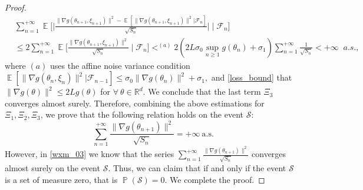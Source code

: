 \documentclass[standalone]{article}
\DeclareMathOperator{\Expect}{\mathbb{E}}
\DeclareMathOperator{\Pro}{\mathbb{P}}
\begin{document}
\begin{proof}
\begin{align*}
&\sum_{n=1}^{+\infty}\Expect\Bigg[\bigg|\frac{\|\nabla g(\theta_{n+1},\xi_{n+1})\|^{2}-\Expect[\|\nabla g(\theta_{n+1},\xi_{n+1})\|^{2}|\mathscr{F}_{n}]}{\sqrt{S_{n}}}\bigg| \mid \mathscr{F}_{n}\Bigg]\\ 
& \leq 2\sum_{n=1}^{+\infty}\Expect\Bigg[\frac{\|\nabla g(\theta_{n+1},\xi_{n+1})\|^{2}}{\sqrt{S_{n}}} \mid \mathscr{F}_{n}\Bigg]  \mathop{<}^{(a)}2(2 L\sigma_{0}\sup_{n\ge 1}g(\theta_{n})+\sigma_{1})\sum_{n=1}^{+\infty}\frac{1}{\sqrt{S_{n}}}<+\infty\  \,\, a.s.,
\end{align*}
where $(a)$ uses the affine noise variance condition $\Expect[\|\nabla g(\theta_{n},\xi_{n})\|^{2}|\mathscr{F}_{n-1}]\le \sigma_{0}\|\nabla g(\theta_{n})\|^{2}+\sigma_{1},$ and \cref{loss_bound} that $ \|\nabla g(\theta)\|^{2}\le 2 Lg(\theta) $ for $\forall\ \theta\in\mathbb{R}^{d}.$
We conclude that the last term $\Xi_3$ converges almost surely. Therefore, combining the above estimations for $\Xi_1, \Xi_2, \Xi_3$, we prove that the following relation holds on the event $\mathcal{S}$: \[\sum_{n=1}^{+\infty}\frac{\|\nabla g(\theta_{n+1})\|^{2}}{\sqrt{S_{n}}}=+\infty\ \text{a.s.}\] 
However, in \cref{wxm_03} we know that the series $\sum_{n=1}^{+\infty}\frac{\|\nabla g(\theta_{n+1})\|^{2}}{\sqrt{S_{n}}}$ converges almost surely on the event $\mathcal{S}$. Thus, we can claim that if and only if the event $\mathcal{S}$ is a set of measure zero, that is $\Pro(\mathcal{S}) = 0.$ We complete the proof. 
\end{proof}

\end{document}
